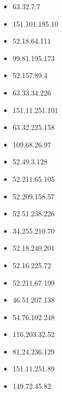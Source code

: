 \documentclass{article}
\begin{document}
\begin{itemize}
    
        \item 63.32.7.7
    
        \item 151.101.195.10
    
        \item 52.18.64.111
    
        \item 99.81.195.173
    
        \item 52.157.89.4
    
        \item 63.33.34.226
    
        \item 151.11.251.101
    
        \item 63.32.225.158
    
        \item 109.68.26.97
    
        \item 52.49.3.128
    
        \item 52.211.65.105
    
        \item 52.209.158.57
    
        \item 52.51.238.226
    
        \item 34.255.210.70
    
        \item 52.18.240.201
    
        \item 52.16.225.72
    
        \item 52.211.67.199
    
        \item 46.51.207.138
    
        \item 54.76.102.248
    
        \item 116.203.32.52
    
        \item 81.24.236.129
    
        \item 151.11.251.89
    
        \item 149.72.45.82
    

\end{itemize}
\end{document}
